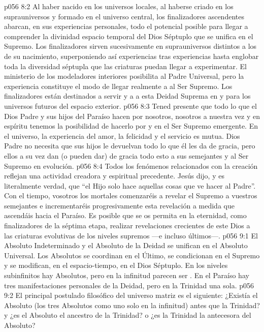 \vs p056 8:2 Al haber nacido en los universos locales, al haberse criado en los suprauniversos y formado en el universo central, los finalizadores ascendentes abarcan, en sus experiencias personales, todo el potencial posible para llegar a comprender la divinidad espacio temporal del Dios Séptuplo que se unifica en el Supremo. Los finalizadores sirven sucesivamente en suprauniversos distintos a los de su nacimiento, superponiendo así experiencias tras experiencias hasta englobar toda la diversidad séptupla que las criaturas puedan llegar a experimentar. El ministerio de los modeladores interiores posibilita  al Padre Universal, pero la experiencia constituye el modo de llegar realmente a  al Ser Supremo. Los finalizadores están destinados a servir y a  a esta Deidad Suprema en y para los universos futuros del espacio exterior.
\vs p056 8:3 Tened presente que todo lo que el Dios Padre y sus hijos del Paraíso hacen por nosotros, nosotros a nuestra vez y en espíritu tenemos la posibilidad de hacerlo por y en el Ser Supremo emergente. En el universo, la experiencia del amor, la felicidad y el servicio es mutua. Dios Padre no necesita que sus hijos le devuelvan todo lo que él les da de gracia, pero ellos a su vez dan (o pueden dar) de gracia todo esto a sus semejantes y al Ser Supremo en evolución.
\vs p056 8:4 Todos los fenómenos relacionados con la creación reflejan una actividad creadora y espiritual precedente. Jesús dijo, y es literalmente verdad, que “el Hijo solo hace aquellas cosas que ve hacer al Padre”. Con el tiempo, vosotros los mortales comenzaréis a revelar el Supremo a vuestros semejantes e incrementaréis progresivamente esta revelación a medida que ascendáis hacia el Paraíso. Es posible que se os permita en la eternidad, como finalizadores de la séptima etapa, realizar revelaciones crecientes de este Dios a las criaturas evolutivas de los niveles supremos ---e incluso últimos---.
\vs p056 9:1 El Absoluto Indeterminado y el Absoluto de la Deidad se unifican en el Absoluto Universal. Los Absolutos se coordinan en el Último, se condicionan en el Supremo y se modifican, en el espacio\hyp{}tiempo, en el Dios Séptuplo. En los niveles subinfinitos hay  Absolutos, pero en la infinitud parecen ser . En el Paraíso hay tres manifestaciones personales de la Deidad, pero en la Trinidad  una sola.
\vs p056 9:2 \pc El principal postulado filosófico del universo matriz es el siguiente: ¿Existía el Absoluto (los tres Absolutos como uno solo en la infinitud) antes que la Trinidad? y ¿es el Absoluto el ancestro de la Trinidad? o ¿es la Trinidad la antecesora del Absoluto?
